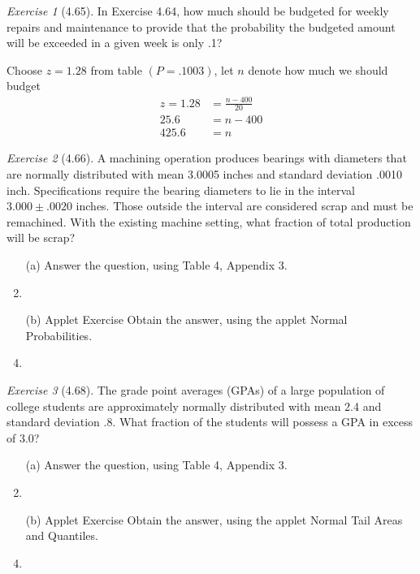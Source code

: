 \documentclass[12pt]{amsart}
\makeatletter
\theoremstyle{remark}
\newtheorem*{exercise}{Exercise}%
\renewenvironment{proof}[1][\proofname]{\par\doublespacing
  \pushQED{\qed}%
  \normalfont \topsep6\p@\@plus6\p@\relax
  \list{}{%
    \settowidth{\leftmargin}{\itshape\proofname:\hskip\labelsep}%
    \setlength{\labelwidth}{0pt}%
    \setlength{\itemindent}{-\leftmargin}%
  }%
  \item[\hskip\labelsep\itshape#1\@addpunct{:}]\ignorespaces
}{%
  \popQED\endlist\@endpefalse
  \singlespacing
}
\theoremstyle{mycomment}
\makeatother
\begin{document}
\begin{exercise}[4.65]
In Exercise 4.64, how much should be budgeted for weekly repairs and maintenance to provide that the probability the budgeted amount will be exceeded in a given week is only .1?

\begin{proof}[Solution]
Choose $z = 1.28$ from table $(P = .1003)$, let $n$ denote how much we should budget
	\begin{align*}
		z = 1.28 &= \frac{n - 400}{20} \\
		25.6 &= n - 400 \\
		425.6 &= n 
	\end{align*}
\end{proof}
\end{exercise}

\begin{exercise}[4.66]
A machining operation produces bearings with diameters that are normally distributed with mean 3.0005 inches and standard deviation .0010 inch. Specifications require the bearing diameters to lie in the interval $3.000 \pm .0020$ inches. Those outside the interval are considered scrap and must be remachined. With the existing machine setting, what fraction of total production will be scrap?

\begin{enumerate}
    \item[(a)] Answer the question, using Table 4, Appendix 3.
\begin{proof}[Solution]
 
\end{proof}
    \item[(b)] Applet Exercise Obtain the answer, using the applet Normal Probabilities.
\begin{proof}[Solution]
 
\end{proof}
\end{enumerate}
\end{exercise}

\begin{exercise}[4.68]
The grade point averages (GPAs) of a large population of college students are approximately normally distributed with mean 2.4 and standard deviation .8. What fraction of the students will possess a GPA in excess of 3.0?

\begin{enumerate}
    \item[(a)] Answer the question, using Table 4, Appendix 3.
\begin{proof}[Solution]
 
\end{proof}
    \item[(b)] Applet Exercise Obtain the answer, using the applet Normal Tail Areas and Quantiles.
\begin{proof}[Solution]
 
\end{proof}
\end{enumerate}
\end{exercise}
\end{document}
